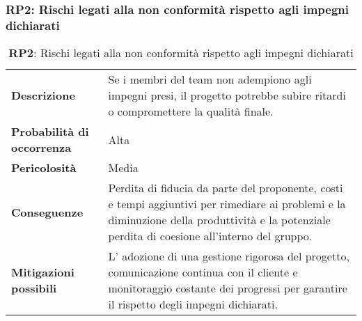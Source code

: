 \subsubsection{RP2: Rischi legati alla non conformità rispetto agli impegni dichiarati}
\begin{table}[h!]
    \centering
    \renewcommand{\arraystretch}{1.5} %
    \begin{tabularx}{\textwidth}{|X|X|}\hline
    \rowcolor[HTML]{FFD700} 
    \multicolumn{2}{|c|}{\textbf{Rischi legati alla non conformità rispetto agli impegni dichiarati}} \\ \hline
    \textbf{Descrizione} &  Se i membri del team non adempiono agli impegni presi, 
    il progetto potrebbe subire ritardi o compromettere la qualità finale. \\ \hline
    \textbf{Probabilità di occorrenza} & Alta \\ \hline
    \textbf{Pericolosità} & Media \\ \hline
    \textbf{Conseguenze} & Perdita di fiducia da parte del proponente, costi e tempi aggiuntivi per rimediare ai problemi e la diminuzione della produttività e la potenziale perdita di coesione all'interno del gruppo. \\ \hline
    \textbf{Mitigazioni possibili} & L' adozione di una gestione rigorosa del progetto, comunicazione continua con il cliente e monitoraggio costante dei progressi per garantire il rispetto degli impegni dichiarati.\\ \hline
    \end{tabularx}
    \caption{\textbf{RP2}: Rischi legati alla non conformità rispetto agli impegni dichiarati}
    \end{table}
